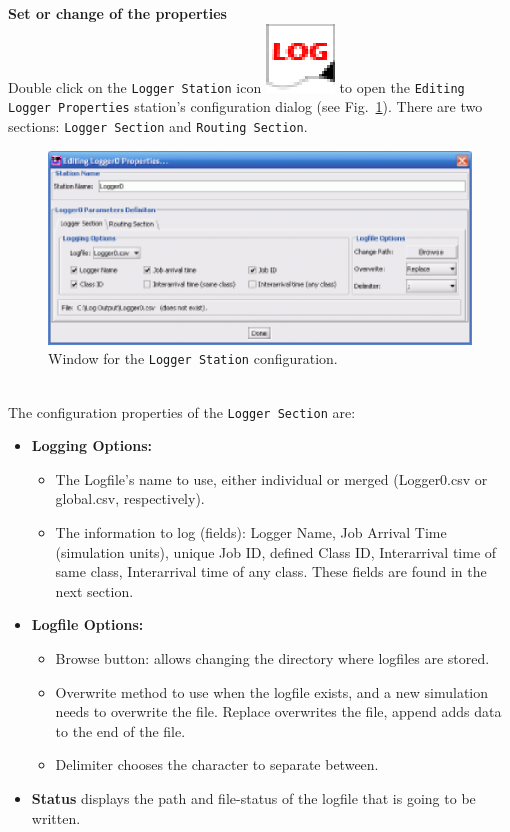 \noindent \textbf{Set or change of the properties}\\
Double click on the \texttt{Logger Station} icon
\includegraphics[scale=.5]{img/jsimg/logger}
to open the \texttt{Editing Logger Properties} station's
configuration dialog (see Fig.~\ref{fig:deditlogg}). There are two
sections:
\texttt{Logger Section} and \texttt{Routing Section}.\\
\begin{figure}[htb]
    \begin{center}
        \includegraphics[scale=.8]{img/jsimg/logger_editFull_sm.eps}
    \end{center}
    \caption{Window for the \texttt{Logger Station} configuration.}
    \label{fig:deditlogg}
\end{figure}

\\
The configuration properties of the \texttt{Logger Section} are:
\begin{itemize} \item \textbf{Logging Options:}
\begin{itemize} \item   The Logfile's name to use, either individual or merged
(Logger0.csv or global.csv, respectively). \item The information
to log (fields): Logger Name, Job Arrival Time (simulation units),
unique Job ID, defined Class ID, Interarrival time of same class,
Interarrival time of any class. These fields are found in the next
section. \end{itemize} \item \textbf{Logfile Options:}
\begin{itemize} \item Browse button: allows changing the directory where
logfiles are stored. \item Overwrite method to use when the
logfile exists, and a new simulation needs to overwrite the file.
Replace overwrites the file, append adds data to the end of the
file. \item Delimiter chooses the character to separate between.
\end{itemize}
\item \textbf{Status} displays the path and file-status of the
logfile that is going to be written.
\end{itemize}

